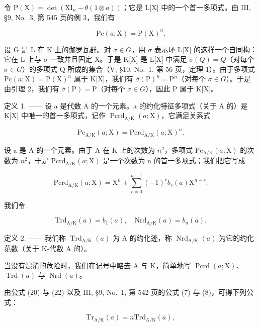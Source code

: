 令 \(\mathrm{P}(\mathrm{X})=\det(\mathrm{XI}_{n}-\theta(1\otimes a))\)；它是 L{[}X{]} 中的一个首一多项式。由 III, §9, No.~3, 第 545 页的例 3，我们有

\[
\mathrm{Pc} (a; \mathrm{X}) = \mathrm{P} (\mathrm{X}) ^ {n}.\tag{19}
\]

设 G 是 L 在 K 上的伽罗瓦群。对 \(\sigma\in G\)，用 \(\overline{\sigma}\) 表示环 L{[}X{]} 的这样一个自同构：它在 L 上与 \(\sigma\) 一致并且固定 X。于是 K{[}X{]} 是 L{[}X{]} 中满足 \(\overline{\sigma}(Q)=Q\)（对每个 \(\sigma\in G\)）的多项式 Q 所成的集合（V, §10, No.~1, 第 56 页，定理 1）。由于多项式 \(\mathrm{Pc}(a;\mathrm{X})=\mathrm{P}(\mathrm{X})^{n}\) 属于 K{[}X{]}，我们有 \(\overline{\sigma}(\mathrm{P})^{n}=\mathrm{P}^{n}\)（对每个 \(\sigma\in G\)）。于是由引理 2，我们有 \(\overline{\sigma}(\mathrm{P})=\mathrm{P}\)（对每个 \(\sigma\in G\)），因此 P 属于 K{[}X{]}。

定义 1. —— 设 a 是代数 A 的一个元素。a 的约化特征多项式（关于 A 的）是 K{[}X{]} 中唯一的首一多项式，记作 \(\operatorname{Pcrd}_{\mathrm{A}/\mathrm{K}}(a;\mathrm{X})\)，它满足关系式

\[
\mathrm{Pc} _ {\mathrm{A/K}} (a; \mathrm{X}) = \mathrm{Pcrd} _ {\mathrm{A/K}} (a; \mathrm{X}) ^ {n}.\tag{20}
\]

设 a 是 A 的一个元素。由于 A 在 K 上的次数为 \(n^{2}\)，多项式 \(\mathrm{Pc}_{\mathrm{A/K}}(a;\mathrm{X})\) 的次数为 \(n^{2}\)，于是 \(\mathrm{Pcrd}_{\mathrm{A/K}}(a;\mathrm{X})\) 是一个次数为 n 的首一多项式；我们把它写成

\[
\mathrm{Pcrd} _ {\mathrm{A/K}} (a; \mathrm{X}) = \mathrm{X} ^ {n} + \sum_ {r = 0} ^ {n - 1} (- 1) ^ {r} b _ {r} (a) \mathrm{X} ^ {n - r}.\tag{21}
\]

我们令

\[
\mathrm{Trd} _ {\mathrm{A/K}} (a) = b _ {1} (a), \quad \mathrm{Nrd} _ {\mathrm{A/K}} (a) = b _ {n} (a).\tag{22}
\]

定义 2. —— 我们称 \(\operatorname{Trd}_{\mathrm{A/K}}(a)\) 为 A 的约化迹，称 \(\operatorname{Nrd}_{\mathrm{A/K}}(a)\) 为它的约化范数（关于 K-代数 A 的）。

当没有混淆的危险时，我们在记号中略去 A 与 K，简单地写 \(\operatorname{Pcrd}(a; \mathrm{X})\)、\(\operatorname{Trd}(a)\) 与 \(\operatorname{Nrd}(a)\)。

由公式 (20) 与 (22) 以及 III, §9, No.~1, 第 542 页的公式 (7) 与 (8)，可得下列公式：

\[
\mathrm{Tr} _ {\mathrm{A/K}} (a) = n \mathrm{Trd} _ {\mathrm{A/K}} (a),\tag{23}
\]

